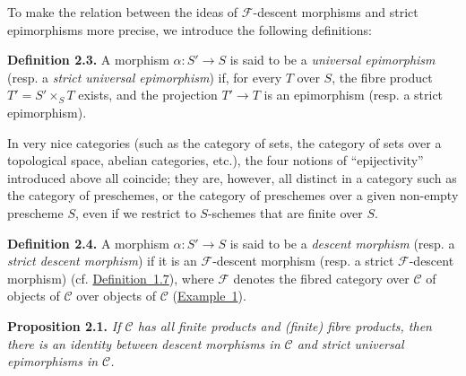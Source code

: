 \documentclass{article}
\newenvironment{itenv}[1]
  {\phantomsection\par\medskip\noindent\textbf{#1.}\itshape}
  {\par\medskip}
\newenvironment{rmenv}[1]
  {\phantomsection\par\medskip\noindent\textbf{#1.}\rmfamily}
  {\par\medskip}
\renewcommand{\cal}[1]{{\mathcal{#1}}}
\begin{document}
To make the relation between the ideas of $\cal{F}$-descent morphisms and strict epimorphisms more precise, we introduce the following definitions:

\begin{rmenv}{Definition 2.3}
  A morphism $\alpha\colon S'\to S$ is said to be a \emph{universal epimorphism} (resp. a \emph{strict universal epimorphism}) if, for every $T$ over $S$, the fibre product $T'=S'\times_S T$ exists, and the projection $T'\to T$ is an epimorphism (resp. a strict epimorphism).
\end{rmenv}

In very nice categories (such as the category of sets, the category of sets over a topological space, abelian categories, etc.), the four notions of ``epijectivity'' introduced above all coincide;
they are, however, all distinct in a category such as the category of preschemes, or the category of preschemes over a given non-empty prescheme $S$, even if we restrict to $S$-schemes that are finite over $S$.

\begin{rmenv}{Definition 2.4}
\label{definition:A.2.4}
  A morphism $\alpha\colon S'\to S$ is said to be a \emph{descent morphism} (resp. a \emph{strict descent morphism}) if it is an $\cal{F}$-descent morphism (resp. a strict $\cal{F}$-descent morphism) (cf. \hyperref[definition:A.1.7]{Definition~1.7}), where $\cal{F}$ denotes the fibred category over $\cal{C}$ of objects of $\cal{C}$ over objects of $\cal{C}$ (\hyperref[example:A.1.1(1)]{Example~1}).
\end{rmenv}

\begin{itenv}{Proposition 2.1}
  If $\cal{C}$ has all finite products and (finite) fibre products, then there is an identity between descent morphisms in $\cal{C}$ and strict universal epimorphisms in $\cal{C}$.
\end{itenv}


\subsection{}
\label{A.2.b}
\end{document}
